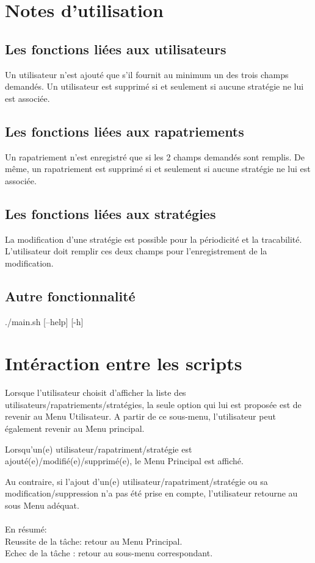 \documentclass[a4paper,11pt]{article}
\begin{document}
\section{Notes d'utilisation}
	\subsection{Les fonctions liées aux utilisateurs}
		Un utilisateur n'est ajouté que s'il fournit au minimum un des trois champs demandés. 
		Un utilisateur est supprimé si et seulement si aucune stratégie ne lui est associée. 

	\subsection{Les fonctions liées aux rapatriements}
		Un rapatriement n'est enregistré que si les 2 champs demandés sont remplis. 
		De même, un rapatriement est supprimé si et seulement si aucune stratégie ne lui est associée. 

	\subsection{Les fonctions liées aux stratégies}
		La modification d'une stratégie est possible pour la périodicité et la tracabilité. L'utilisateur doit remplir ces deux champs pour l'enregistrement de la modification.

	\subsection{Autre fonctionnalité}
		./main.sh [--help] [-h]

\section{Intéraction entre les scripts}
	Lorsque l'utilisateur choisit d'afficher la liste des utilisateurs/rapatriements/stratégies, la seule option qui lui est proposée est de revenir au Menu Utilisateur. A partir de ce sous-menu, l'utilisateur peut également revenir au Menu principal. 
	
	Lorsqu'un(e) utilisateur/rapatriment/stratégie est ajouté(e)/modifié(e)/supprimé(e), le Menu Principal est affiché.

	Au contraire, si l'ajout d'un(e) utilisateur/rapatriment/stratégie ou sa modification/suppression n'a pas été prise en compte, l'utilisateur retourne au sous Menu adéquat.\\
	\\En résumé: \\Reussite de la tâche: retour au Menu Principal. \\Echec de la tâche : retour au sous-menu correspondant. 
\end{document}
